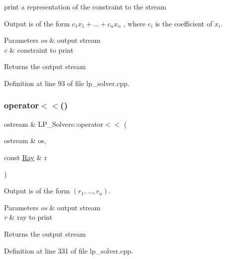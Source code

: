 print a representation of the constraint to the stream 

Output is of the form $ c_1 x_1 + \ldots + c_n x_n $ , where $ c_i $ is the coefficient of $ x_i $.


\begin{DoxyParams}{Parameters}
{\em os} & output stream \\
\hline
{\em c} & constraint to print \\
\hline
\end{DoxyParams}
\begin{DoxyReturn}{Returns}
the output stream 
\end{DoxyReturn}


Definition at line 93 of file lp\+\_\+solver.\+cpp.

\mbox{\label{namespace_l_p___solvers_a7f4d40aebb685ca6ddc48f91939bb523}} 
\subsubsection{\texorpdfstring{operator$<$$<$()}{operator<<()}\hspace{0.1cm}{\footnotesize\ttfamily [3/4]}}
{\footnotesize\ttfamily ostream \& L\+P\+\_\+\+Solvers\+::operator$<$$<$ (\begin{DoxyParamCaption}\item[{ostream \&}]{os,  }\item[{const \hyperlink{group___c_l_s_solvers_class_l_p___solvers_1_1_ray}{Ray} \&}]{r }\end{DoxyParamCaption})}



Output is of the form $(r_1, \ldots, r_n)$. 


\begin{DoxyParams}{Parameters}
{\em os} & output stream \\
\hline
{\em r} & ray to print \\
\hline
\end{DoxyParams}
\begin{DoxyReturn}{Returns}
the output stream 
\end{DoxyReturn}


Definition at line 331 of file lp\+\_\+solver.\+cpp.

\mbox{\label{namespace_l_p___solvers_afdd12afffaacd4070fc0aa3b1297d47d}} 
